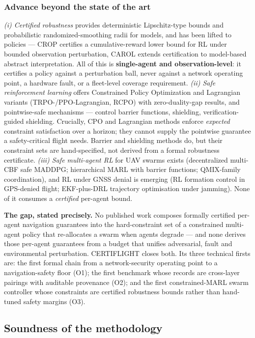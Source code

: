 \documentclass[11pt,a4paper]{article}
\begin{document}
\subsubsection{Advance beyond the state of the art}
\emph{(i) Certified robustness} provides deterministic Lipschitz-type bounds and probabilistic randomized-smoothing radii for models, and has been lifted to policies --- CROP certifies a cumulative-reward lower bound for RL under bounded observation perturbation, CAROL extends certification to model-based abstract interpretation. All of this is \textbf{single-agent and observation-level}: it certifies a policy against a perturbation ball, never against a network operating point, a hardware fault, or a fleet-level coverage requirement.
\emph{(ii) Safe reinforcement learning} offers Constrained Policy Optimization and Lagrangian variants (TRPO-/PPO-Lagrangian, RCPO) with zero-duality-gap results, and pointwise-safe mechanisms --- control barrier functions, shielding, verification-guided shielding. Crucially, CPO and Lagrangian methods enforce \emph{expected} constraint satisfaction over a horizon; they cannot supply the pointwise guarantee a safety-critical flight needs. Barrier and shielding methods do, but their constraint sets are hand-specified, not derived from a formal robustness certificate.
\emph{(iii) Safe multi-agent RL} for UAV swarms exists (decentralized multi-CBF safe MADDPG; hierarchical MARL with barrier functions; QMIX-family coordination), and RL under GNSS denial is emerging (RL formation control in GPS-denied flight; EKF-plus-DRL trajectory optimisation under jamming). None of it consumes a \emph{certified} per-agent bound.

\textbf{The gap, stated precisely.} No published work composes formally certified per-agent navigation guarantees into the hard-constraint set of a constrained multi-agent policy that re-allocates a swarm when agents degrade --- and none derives those per-agent guarantees from a budget that unifies adversarial, fault and environmental perturbation. CERTIFLIGHT closes both. Its three technical firsts are: the first formal chain from a network-security operating point to a navigation-safety floor (O1); the first benchmark whose records are cross-layer pairings with auditable provenance (O2); and the first constrained-MARL swarm controller whose constraints are certified robustness bounds rather than hand-tuned safety margins (O3).

\subsection{Soundness of the methodology}
\end{document}
